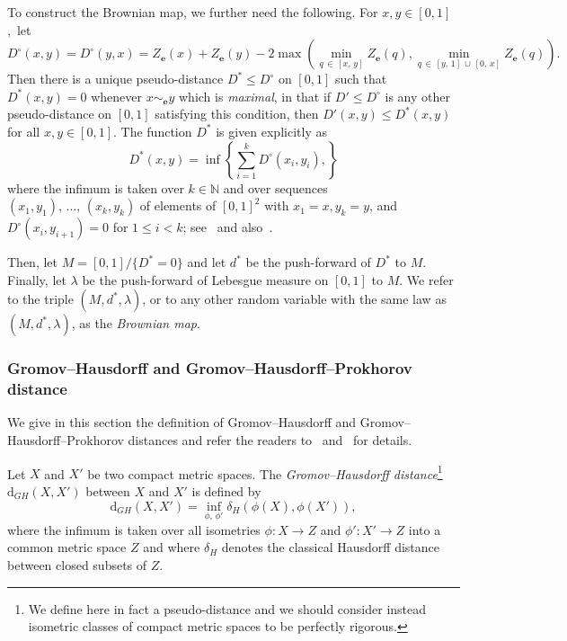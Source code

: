 \documentclass[AHL,Unicode,longabstracts,published]{cedram}
\providecommand{\N}{}
\renewcommand{\N}{\mathbb{N}}
\newcommand{\be}{\mathbf{e}}
\newcommand{\rd}{\mathrm{d}}
\begin{document}
To construct the Brownian map, we further need the following. For $x,y\in [0,1]$,~let
\begin{equation}\label{eq:defDrond}
D^\circ(x,y)=D^\circ(y,x)=Z_{\be}(x)+Z_{\be}(y)-2\max\left(\min_{q\,\in\,[x,\,y]} Z_{\be}(q),\min_{q\,\in\,[y,\,1]\,\cup\,[0,\,x]}Z_{\be}(q)\right).
\end{equation}
Then there is a unique pseudo-distance $D^* \le D^\circ$ on $[0,1]$ such that $D^*(x,y)=0$ whenever $x\sim_{\be}y$ which is {\em maximal}, in that if $D' \le D^\circ$ is any other pseudo-distance on $[0,1]$ satisfying this condition, then $D'(x,y) \le D^*(x,y)$ for all $x,y \in [0,1]$. The function $D^*$ is given explicitly as
\[
D^*(x,y) = \inf\left\{\sum_{i=1}^k D^\circ(x_i,y_i),\right\}
\]
where the infimum is taken over $k \in \N$ and over sequences $(x_1,y_1),\,\ldots,\,(x_k,y_k)$ of elements of $[0,1]^2$ with $x_1=x,y_k=y$, and $D^{\circ}(x_{i},y_{i+1})=0$ for $1 \le i < k$; see~\cite[Section~3.1.2]{MR1835418} and also~\cite{LeGallInventiones,MiermontBrownian}.

Then, let $M=[0,1]/\{D^*=0\}$ and let $d^*$ be the push-forward of $D^*$ to $M$. Finally, let $\lambda$ be the push-forward of Lebesgue measure on $[0,1]$ to $M$. We refer to the triple $(M,d^*,\lambda)$, or to any other random variable with the same law as $(M,d^*,\lambda)$, as the \emph{Brownian map}.

\subsubsection{Gromov--Hausdorff and Gromov--Hausdorff--Prokhorov distance}

We give in this section the definition of Gromov--Hausdorff and Gromov--Hausdorff--Prokhorov distances and refer the readers to~\cite{GrevenPfaffelhuberWinter} and~\cite[Section~6]{Mier09} for details.

Let $X$ and $X'$ be two compact metric spaces. The \emph{Gromov--Hausdorff distance}\footnote{We define here in fact a pseudo-distance and we should consider instead isometric classes of compact metric spaces to be perfectly rigorous.} $\rd_{GH}(X,X')$ between $X$ and $X'$ is defined by
\[
\rd_{GH}(X,X')=\inf_{\phi,\,\phi'}\delta_H\left(\phi(X),\phi(X')\right),
\]
where the infimum is taken over all isometries $\phi:X\rightarrow Z$ and $\phi':X'\rightarrow Z$ into a common metric space $Z$ and where $\delta_H$ denotes the classical Hausdorff distance between closed subsets of $Z$.
\end{document}
